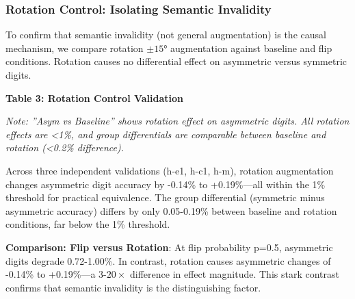 \subsubsection{Rotation Control: Isolating Semantic Invalidity}

To confirm that semantic invalidity (not general augmentation) is the causal mechanism, we compare rotation $\pm 15$° augmentation against baseline and flip conditions. Rotation causes no differential effect on asymmetric versus symmetric digits.

\textbf{Table 3: Rotation Control Validation}

\begin{table}[htbp]
\centering
{}
\end{table}

\textit{Note: ''Asym vs Baseline'' shows rotation effect on asymmetric digits. All rotation effects are <1\%, and group differentials are comparable between baseline and rotation (<0.2\% difference).}

Across three independent validations (h-e1, h-c1, h-m), rotation augmentation changes asymmetric digit accuracy by -0.14\% to +0.19\%---all within the 1\% threshold for practical equivalence. The group differential (symmetric minus asymmetric accuracy) differs by only 0.05-0.19\% between baseline and rotation conditions, far below the 1\% threshold.

\textbf{Comparison: Flip versus Rotation}: At flip probability p=0.5, asymmetric digits degrade 0.72-1.00\%. In contrast, rotation causes asymmetric changes of -0.14\% to +0.19\%---a 3-$20\times$ difference in effect magnitude. This stark contrast confirms that semantic invalidity is the distinguishing factor.

